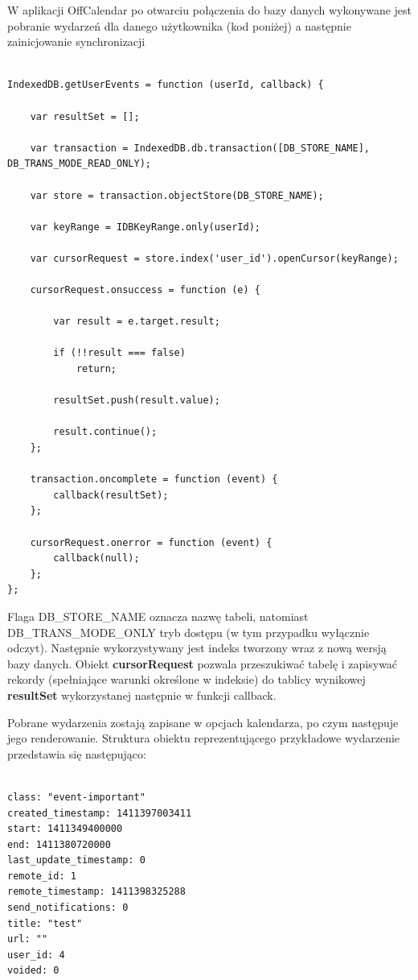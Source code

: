 W aplikacji OffCalendar po otwarciu połączenia do bazy danych wykonywane jest pobranie wydarzeń dla danego użytkownika (kod poniżej) a następnie zainicjowanie synchronizacji

\begin{lstlisting}[caption=Pobranie wydarzeń użytkownika., label=amb, captionpos=b]

IndexedDB.getUserEvents = function (userId, callback) {

    var resultSet = [];

    var transaction = IndexedDB.db.transaction([DB_STORE_NAME], DB_TRANS_MODE_READ_ONLY);

    var store = transaction.objectStore(DB_STORE_NAME);

    var keyRange = IDBKeyRange.only(userId);

    var cursorRequest = store.index('user_id').openCursor(keyRange);

    cursorRequest.onsuccess = function (e) {

        var result = e.target.result;

        if (!!result === false)
            return;

        resultSet.push(result.value);

        result.continue();
    };

    transaction.oncomplete = function (event) {
        callback(resultSet);
    };

    cursorRequest.onerror = function (event) {
        callback(null);
    };
};

\end{lstlisting}

Flaga DB\_STORE\_NAME oznacza nazwę tabeli, natomiast DB\_TRANS\_MODE\_ONLY tryb dostępu (w tym przypadku wyłącznie odczyt). Następnie wykorzystywany jest indeks tworzony wraz z nową wersją bazy danych. Obiekt \textbf{cursorRequest} pozwala przeszukiwać tabelę i zapisywać rekordy (spełniające warunki określone w indeksie) do tablicy wynikowej \textbf{resultSet} wykorzystanej następnie w funkcji callback.

Pobrane wydarzenia zostają zapisane w opcjach kalendarza, po czym następuje jego renderowanie. Struktura obiektu reprezentującego przykładowe wydarzenie przedstawia się następująco:

\begin{lstlisting}[caption=Struktura obiektu reprezentującego wydarzenie., label=amb, captionpos=b]

class: "event-important"
created_timestamp: 1411397003411
start: 1411349400000
end: 1411380720000
last_update_timestamp: 0
remote_id: 1
remote_timestamp: 1411398325288
send_notifications: 0
title: "test"
url: ""
user_id: 4
voided: 0

\end{lstlisting}

